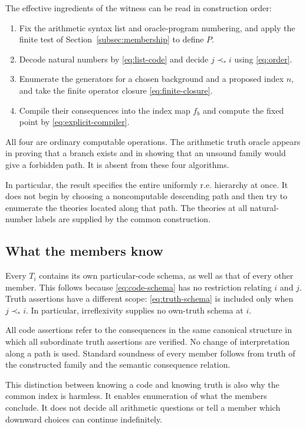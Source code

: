\documentclass[11pt]{article}
\theoremstyle{definition}
\begin{document}
The effective ingredients of the witness can be read in construction order:
\begin{enumerate}
\item Fix the arithmetic syntax list and oracle-program numbering, and
apply the finite test of Section~\ref{subsec:membership} to define $P$.
\item Decode natural numbers by \eqref{eq:list-code} and decide $j\prec_*i$
using \eqref{eq:order}.
\item Enumerate the generators for a chosen background and a proposed
index $n$, and take the finite operator closure \eqref{eq:finite-closure}.
\item Compile their consequences into the index map $f_b$ and compute
the fixed point by \eqref{eq:explicit-compiler}.
\end{enumerate}
All four are ordinary computable operations. The arithmetic truth oracle
appears in proving that a branch exists and in showing that an unsound
family would give a forbidden path. It is absent from these four algorithms.

In particular, the result specifies the entire uniformly r.e. hierarchy
at once. It does not begin by choosing a noncomputable descending path and
then try to enumerate the theories located along that path. The theories
at all natural-number labels are supplied by the common construction.

\subsection{What the members know}

Every $T_i$ contains its own particular-code schema, as well as that of
every other member. This follows because \eqref{eq:code-schema} has no
restriction relating $i$ and $j$. Truth assertions have a different
scope: \eqref{eq:truth-schema} is included only when $j\prec_*i$. In
particular, irreflexivity supplies no own-truth schema at $i$.

All code assertions refer to the consequences in the same canonical
structure in which all subordinate truth assertions are verified. No
change of interpretation along a path is used. Standard soundness of
every member follows from truth of the constructed family and the
semantic consequence relation.

This distinction between knowing a code and knowing truth is also why
the common index is harmless. It enables enumeration of what the
members conclude. It does not decide all arithmetic questions or tell a
member which downward choices can continue indefinitely.
\end{document}
